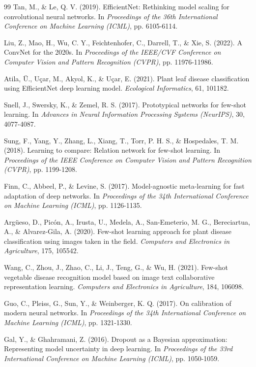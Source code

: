 \begin{thebibliography}{99}
Tan, M., \& Le, Q. V. (2019). EfficientNet: Rethinking model scaling for convolutional neural networks.
In \textit{Proceedings of the 36th International Conference on Machine Learning (ICML)}, pp. 6105-6114.

Liu, Z., Mao, H., Wu, C. Y., Feichtenhofer, C., Darrell, T., \& Xie, S. (2022). A ConvNet for the 2020s.
In \textit{Proceedings of the IEEE/CVF Conference on Computer Vision and Pattern Recognition (CVPR)}, pp. 11976-11986.

Atila, Ü., Uçar, M., Akyol, K., \& Uçar, E. (2021). Plant leaf disease classification using EfficientNet deep learning model.
\textit{Ecological Informatics}, 61, 101182.

Snell, J., Swersky, K., \& Zemel, R. S. (2017). Prototypical networks for few-shot learning.
In \textit{Advances in Neural Information Processing Systems (NeurIPS)}, 30, 4077-4087.

Sung, F., Yang, Y., Zhang, L., Xiang, T., Torr, P. H. S., \& Hospedales, T. M. (2018). Learning to compare: Relation network for few-shot learning.
In \textit{Proceedings of the IEEE Conference on Computer Vision and Pattern Recognition (CVPR)}, pp. 1199-1208.

Finn, C., Abbeel, P., \& Levine, S. (2017). Model-agnostic meta-learning for fast adaptation of deep networks.
In \textit{Proceedings of the 34th International Conference on Machine Learning (ICML)}, pp. 1126-1135.

Argüeso, D., Picón, A., Irusta, U., Medela, A., San-Emeterio, M. G., Bereciartua, A., \& Alvarez-Gila, A. (2020). Few-shot learning approach for plant disease classification using images taken in the field.
\textit{Computers and Electronics in Agriculture}, 175, 105542.

Wang, C., Zhou, J., Zhao, C., Li, J., Teng, G., \& Wu, H. (2021). Few-shot vegetable disease recognition model based on image text collaborative representation learning.
\textit{Computers and Electronics in Agriculture}, 184, 106098.

Guo, C., Pleiss, G., Sun, Y., \& Weinberger, K. Q. (2017). On calibration of modern neural networks.
In \textit{Proceedings of the 34th International Conference on Machine Learning (ICML)}, pp. 1321-1330.

Gal, Y., \& Ghahramani, Z. (2016). Dropout as a Bayesian approximation: Representing model uncertainty in deep learning.
In \textit{Proceedings of the 33rd International Conference on Machine Learning (ICML)}, pp. 1050-1059.


\end{thebibliography}
